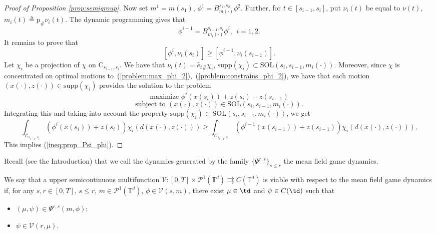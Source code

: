 \documentclass[a4paper,12pt]{article}
\newcommand{\ptd}{\mathcal{P}^1(\mathbb{T}^d)}
\begin{document}
\begin{proof}[Proof of Proposition \ref{prop:semigroup}]
	Now set $m^1=m(s_1)$, $\phi^1=B^{s_1,s_2}_{m(\cdot)}\phi^2$. Further, for $t\in [s_{i-1},s_{i}]$, put  $\nu_i(t)$ be equal to $\nu(t)$, $m_i(t)\triangleq \mathrm{p}_\#\nu_i(t)$. The dynamic programming gives that
	$$\phi^{i-1}=B^{s_{i-1},s_i}_{m_i(\cdot)}\phi^{i}, \ \ i=1,2. $$ It remains to prove that \begin{equation}\label{ineq:prop_Psi_phi}
	[\phi^i,\nu_i(s_i)]\geq [\phi^{i-1},\nu_i(s_{i-1})].
	\end{equation} Let $\chi_i$ be a projection of $\chi$ on $\mathrm{C}_{s_{i-1},s_i}$. We have that $\nu_i(t)=\hat{e}_t{}_\#\chi_i$, $\mathrm{supp}(\chi_i)\subset \mathrm{SOL}(s_i,s_{i-1},m_i(\cdot))$. Moreover, since $\chi$ is concentrated on optimal motions to~(\ref{problem:max_phi_2}),~(\ref{problem:constrains_phi_2}), we have that each motion $(x(\cdot),z(\cdot))\in\mathrm{supp}(\chi_i)$ provides the solution to the problem 
	\begin{equation*}\label{problem:max_phi_i}
	\text{maximize }\phi^i(x(s_i))+z(s_i)-z(s_{i-1}) 
	\end{equation*}
	\begin{equation*}\label{problem:constrains_phi_i}
	\text{subject to }(x(\cdot),z(\cdot))\in\mathrm{SOL}(s_i,s_{i-1},m_i(\cdot)). 
	\end{equation*} Integrating this and taking into account the property $\mathrm{supp}(\chi_i)\subset \mathrm{SOL}(s_i,s_{i-1},m_i(\cdot))$, we get
	\begin{equation*}
	\int_{\mathcal{C}_{s_{i-1},s_i}}(\phi^i(x(s_i))+z(s_i))\chi_i(d(x(\cdot),z(\cdot)))\geq \int_{\mathcal{C}_{s_{i-1},s_i}} (\phi^{i-1}(x(s_{i-1}))+z(s_{i-1}))\chi_i(d(x(\cdot),z(\cdot))).
	\end{equation*}
	This implies (\ref{ineq:prop_Psi_phi}).
\end{proof}

Recall (see the Introduction) that we call the dynamics generated by the family $\{\Psi^{r,s}\}_{s\leq r}$ the mean field game dynamics.

\begin{definition}\label{def:dpp}
	We say that a upper semicontinuous   multifunction $\mathcal{V}:[0,T]\times \ptd\rightrightarrows C(\mathbb{T}^d)$ is viable with respect to the mean field game dynamics if, for any $s,r\in [0,T]$, $s\leq r$, $m\in\ptd$, $\phi\in \mathcal{V}(s,m)$, there exist $\mu\in \td$ and $\psi\in C(\td)$ such that 
	\begin{itemize}
		\item $(\mu,\psi)\in \Psi^{r,s}(m,\phi)$;
		\item $\psi\in \mathcal{V}(r,\mu)$.
	\end{itemize}
\end{definition}
\end{document}
